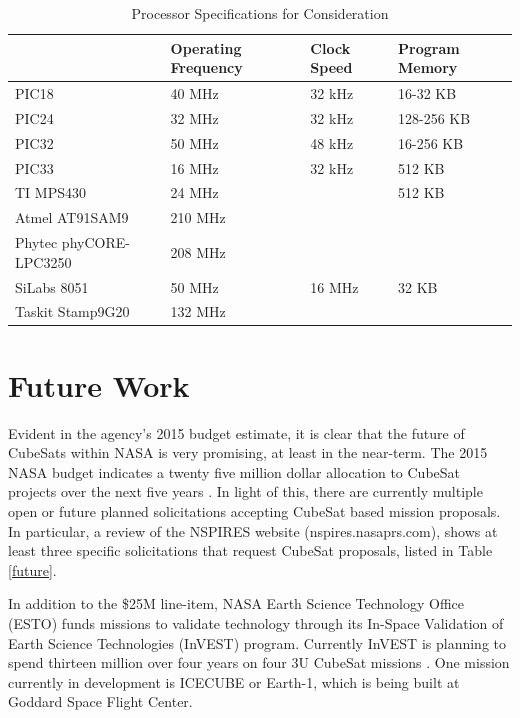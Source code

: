 \documentclass[11pt]{article}
\begin{document}
\begin{table}[h]
\caption{Processor Specifications for Consideration}
\label{processorspecs}
\begin{tabular}{|l|l|l|l|}
\hline
\textbf{} & \textbf{Operating Frequency} & \textbf{Clock Speed} & \textbf{Program Memory} \\ \hline
PIC18 & 40 MHz & 32 kHz & 16-32 KB \\ \hline
PIC24 & 32 MHz & 32 kHz & 128-256 KB \\ \hline
PIC32 & 50 MHz & 48 kHz & 16-256 KB \\ \hline
PIC33 & 16 MHz & 32 kHz & 512 KB \\ \hline
TI MPS430 & 24 MHz &  & 512 KB \\ \hline
Atmel AT91SAM9 & 210 MHz &  &  \\ \hline
Phytec phyCORE-LPC3250 & 208 MHz &  &  \\ \hline
SiLabs 8051 & 50 MHz & 16 MHz & 32 KB \\ \hline
Taskit Stamp9G20 & 132 MHz &  &  \\ \hline
\end{tabular}
\end{table}

\section{Future Work}
Evident in the agency's 2015 budget estimate, it is clear that the future of CubeSats within NASA is very promising, at least in the near-term. The 2015 NASA budget indicates a twenty five million dollar allocation to CubeSat projects over the next five years \cite{budget}. In light of this, there are currently multiple open or future planned solicitations accepting CubeSat based mission proposals. In particular, a review of the NSPIRES website (nspires.nasaprs.com), shows at least three specific solicitations that request CubeSat proposals, listed in Table \ref{future}. 

In addition to the \$25M line-item, NASA Earth Science Technology Office (ESTO) funds missions to validate technology through its In-Space Validation of Earth Science Technologies (InVEST) program. Currently InVEST is planning to spend thirteen million over four years on four 3U CubeSat missions \cite{klumpar}. One mission currently in development is ICECUBE or Earth-1, which is being built at Goddard Space Flight Center. 
\end{document}
